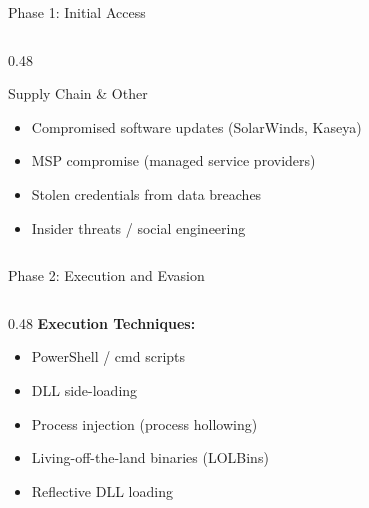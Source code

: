 \documentclass[aspectratio=169]{beamer}
\begin{document}
\begin{frame}{Phase 1: Initial Access}
\begin{columns}[T]
\begin{column}{0.48\textwidth}
\begin{block}{Supply Chain \& Other}
        \footnotesize
        \begin{itemize}
          \item Compromised software updates (SolarWinds, Kaseya)
          \item MSP compromise (managed service providers)
          \item Stolen credentials from data breaches
          \item Insider threats / social engineering
        \end{itemize}
      \end{block}
    \end{column}
  \end{columns}
\end{frame}

\begin{frame}{Phase 2: Execution and Evasion}
  \begin{columns}[T]
    \begin{column}{0.48\textwidth}
      \textbf{Execution Techniques:}
      \begin{itemize}
        \item PowerShell / cmd scripts
        \item DLL side-loading
        \item Process injection (process hollowing)
        \item Living-off-the-land binaries (LOLBins)
        \item Reflective DLL loading
      \end{itemize}


\end{column}
\end{columns}
\end{frame}
\end{document}

